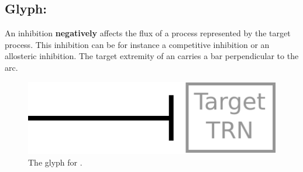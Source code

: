 
\subsection{Glyph: }\label{sec:inhibition}

An inhibition \textbf{negatively} affects the flux of a process represented by the target process. This inhibition can be for instance a competitive inhibition or an allosteric inhibition. The target extremity of an  carries a bar perpendicular to the arc.

\begin{figure}[H]
  \centering
  \includegraphics[scale = 0.5]{images/inhibition}
  \caption{The \PD glyph for .}
  \label{fig:inhibition}
\end{figure}

